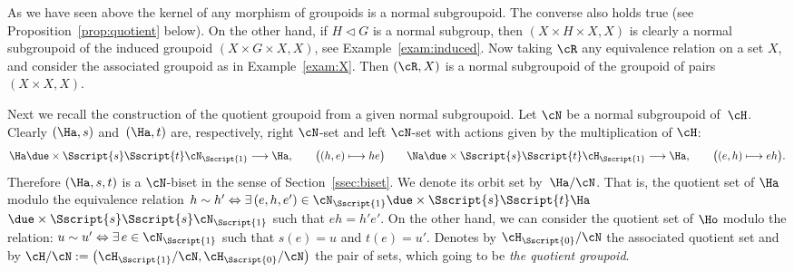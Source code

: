 \begin{Example}\label{exam:Normal}
As we have seen above the kernel of any morphism of groupoids is a normal subgroupoid. The converse also holds true (see Proposition~\ref{prop:quotient} below). On the other hand, if $H \lhd G$ is a normal subgroup, then $(X \times H \times X, X)$ is clearly a normal subgroupoid of the induced groupoid $(X \times G \times X, X)$, see Example~\ref{exam:induced}. Now taking $\cR$ any equivalence relation on a set $X$, and consider the associated groupoid as in Example~\ref{exam:X}. Then $(\cR,X)$ is a normal subgroupoid of the groupoid of pairs $(X\times X, X)$.
\end{Example}

Next we recall the construction of the quotient groupoid from a given normal subgroupoid. Let $\cN$ be a normal subgroupoid of~$\cH$. Clearly $(\Ha,s)$ and~$(\Ha,t)$ are, respectively, right $\cN$-set and left $\cN$-set with actions given by the multiplication of $\cH$:
\begin{gather*}
\Ha \due \times {\Sscript{s}} { \Sscript{t}} \cN_{\Sscript{1}} \longrightarrow \Ha,\qquad \big((h,e) \longmapsto
he \big) \qquad \Na \due \times {\Sscript{s}} { \Sscript{t}} \cH_{\Sscript{1}} \longrightarrow \Ha,\qquad \big((e,h) \longmapsto eh \big).
\end{gather*}
Therefore $(\Ha, s, t)$ is a $\cN$-biset in the sense of Section~\ref{ssec:biset}. We denote its orbit set by~$\Ha/\cN$. That is, the quotient set of $\Ha$ modulo the equivalence relation $h \sim h' \Leftrightarrow \exists\, (e,h,e') \in \cN_{\Sscript{1}} \due \times {\Sscript{s}} { \Sscript{t}} \Ha $ $\due \times {\Sscript{s}}{ \Sscript{s}} \cN_{\Sscript{1}}$ such that $eh = h'e'$. On the other hand, we can consider the quotient set of $\Ho$ modulo the relation: $u \sim u' \Leftrightarrow \exists\, e \in \cN_{\Sscript{1}}$ such that $s(e)=u$ and $t(e)=u'$. Denotes by $\cH_{\Sscript{0}}/\cN$ the associated quotient set and by $\cH/\cN:=\big(\cH_{\Sscript{1}}/\cN, \cH_{\Sscript{0}}/\cN \big)$ the pair of sets, which going to be \emph{the quotient groupoid}.

